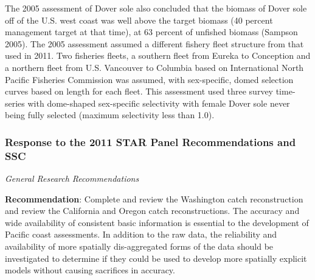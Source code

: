 \documentclass[11pt,
  english,
  a4paper,
]{article}
\begin{document}
The 2005 assessment of Dover sole also concluded that the biomass of Dover sole off of the U.S. west coast was well above the target biomass (40 percent management target at that time), at 63 percent of unfished biomass {(Sampson 2005)\leavevmode\tagmcend\tagstructend}. The 2005 assessment assumed a different fishery fleet structure from that used in 2011. Two fisheries fleets, a southern fleet from Eureka to Conception and a northern fleet from U.S. Vancouver to Columbia based on International North Pacific Fisheries Commission was assumed, with sex-specific, domed selection curves based on length for each fleet. This assessment used three survey time-series with dome-shaped sex-specific selectivity with female Dover sole never being fully selected (maximum selectivity less than 1.0).

\leavevmode\tagmcend\tagstructend\par


\hypertarget{response-to-the-2011-star-panel-recommendations-and-ssc}{%
\subsubsection{Response to the 2011 STAR Panel Recommendations and SSC}\label{response-to-the-2011-star-panel-recommendations-and-ssc}}

\leavevmode\tagmcend\tagstructend


\emph{General Research Recommendations}

\leavevmode\tagmcend\tagstructend\par


\textbf{Recommendation}: Complete and review the Washington catch reconstruction and review the California and Oregon catch reconstructions. The accuracy and wide availability of consistent basic information is essential to the development of Pacific coast assessments. In addition to the raw data, the reliability and availability of more spatially dis-aggregated forms of the data should be investigated to determine if they could be used to develop more spatially explicit models without causing sacrifices in accuracy.

\leavevmode\tagmcend\tagstructend\par
\end{document}
